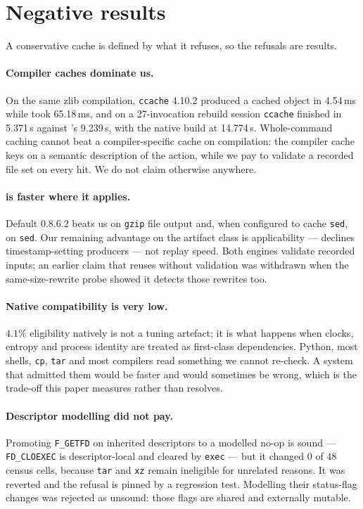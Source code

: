 \section{Negative results}
\label{sec:negative}

A conservative cache is defined by what it refuses, so the refusals are results.

\paragraph{Compiler caches dominate us.}
On the same zlib compilation, \texttt{ccache} 4.10.2 produced a cached object in 4.54\,ms while
\tracejit{} took 65.18\,ms, and on a 27-invocation rebuild session \texttt{ccache} finished in
5.371\,s against \tracejit's 9.239\,s, with the native build at 14.774\,s. Whole-command caching
cannot beat a compiler-specific cache on compilation: the compiler cache keys on a semantic
description of the action, while we pay to validate a recorded file set on every hit. We do not
claim otherwise anywhere.

\paragraph{\firebuild{} is faster where it applies.}
Default \firebuild{} 0.8.6.2 beats us on \texttt{gzip} file output and, when configured to cache
\texttt{sed}, on \texttt{sed}. Our remaining advantage on the artifact class is applicability ---
\firebuild{} declines timestamp-setting producers --- not replay speed. Both engines validate
recorded inputs; an earlier claim that \firebuild{} reuses without validation was withdrawn when
the same-size-rewrite probe showed it detects those rewrites too.

\paragraph{Native compatibility is very low.}
$4.1\%$ eligibility natively is not a tuning artefact; it is what happens when clocks, entropy and
process identity are treated as first-class dependencies. Python, most shells, \texttt{cp},
\texttt{tar} and most compilers read something we cannot re-check. A system that admitted them
would be faster and would sometimes be wrong, which is the trade-off this paper measures rather
than resolves.

\paragraph{Descriptor modelling did not pay.}
Promoting \texttt{F\_GETFD} on inherited descriptors to a modelled no-op is sound ---
\texttt{FD\_CLOEXEC} is descriptor-local and cleared by \texttt{exec} --- but it changed 0 of 48
census cells, because \texttt{tar} and \texttt{xz} remain ineligible for unrelated reasons. It was
reverted and the refusal is pinned by a regression test. Modelling their status-flag changes was
rejected as unsound: those flags are shared and externally mutable.

